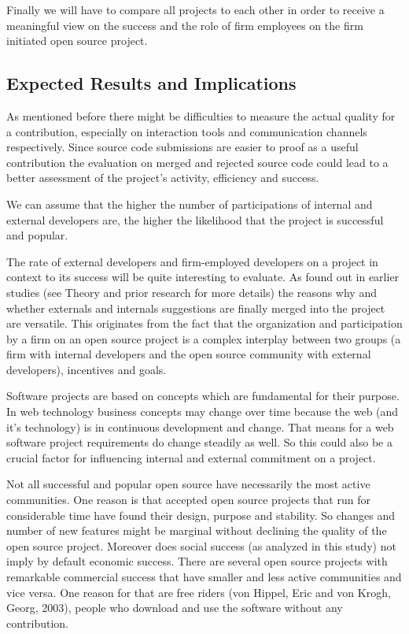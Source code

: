 Finally we will have to compare all projects to each other in order to receive a meaningful view on the success and the role of firm employees on the firm initiated open source project.

\subsection{Expected Results and Implications}

As mentioned before there might be difficulties to measure the actual quality for a contribution, especially on interaction tools and communication channels respectively. Since source code submissions are easier to proof as a useful contribution the evaluation on merged and rejected source code  could lead to a better assessment of the project’s activity, efficiency and success.

We can assume that the higher the number of participations of internal and external developers are, the higher the likelihood that the project is successful and popular.

The rate of external developers and firm-employed developers on a project in context to its success will be quite interesting to evaluate. As found out in earlier studies (see Theory and prior research for more details) the reasons why and whether externals and internals suggestions are finally merged into the project are versatile. This originates from the fact that the organization and participation by a firm on an open source project is a complex interplay between two groups (a firm with internal developers and the open source community with external developers), incentives and goals.

Software projects are based on concepts which are fundamental for their purpose. In web technology business concepts may change over time because the web (and it's technology) is in continuous development and change. That means for a web software project requirements do change steadily as well. So this could also be a crucial factor for influencing internal and external commitment on a project.

Not all successful and popular open source have necessarily the most active communities. One reason is that accepted open source projects that run for considerable time have found their design, purpose and stability. So changes and number of new features might be marginal without declining the quality of the open source project. Moreover does social success (as analyzed in this study) not imply by default economic success. There are several open source projects with remarkable commercial success that have smaller and less active communities and vice versa. One reason for that are free riders (von Hippel, Eric and von Krogh, Georg, 2003), people who download and use the software without any contribution.

